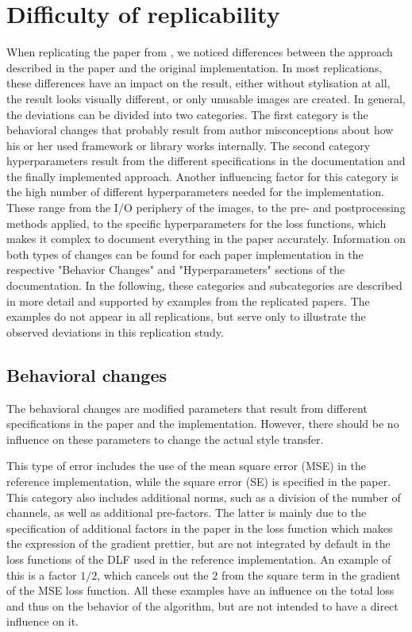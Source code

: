 \section{Difficulty of replicability} \label{sec:replicability}

When replicating the paper from , we noticed differences between the approach described in the paper and the original implementation. In most replications, these differences have an impact on the result, either without stylisation at all, the result looks visually different, or only unusable images are created. In general, the deviations can be divided into two categories. The first category is the behavioral changes that probably result from author misconceptions about how his or her used framework or library works internally. The second category hyperparameters result from the different specifications in the documentation and the finally implemented approach. Another influencing factor for this category is the high number of different hyperparameters needed for the implementation. These range from the I/O periphery of the images, to the pre- and postprocessing methods applied, to the specific hyperparameters for the loss functions, which makes it complex to document everything in the paper accurately. Information on both types of changes can be found for each paper implementation in the respective "Behavior Changes" and "Hyperparameters" sections of the documentation. In the following, these categories and subcategories are described in more detail and supported by examples from the replicated papers. The examples do not appear in all replications, but serve only to illustrate the observed deviations in this replication study.

\subsection{Behavioral changes}

The behavioral changes are modified parameters that result from different specifications in the paper and the implementation. However, there should be no influence on these parameters to change the actual style transfer.  

This type of error includes the use of the mean square error (MSE) in the reference implementation, while the square error (SE) is specified in the paper. This category also includes additional norms, such as a division of the number of channels, as well as additional pre-factors. The latter is mainly due to the specification of additional factors in the paper in the loss function which makes the expression of the gradient prettier, but are not integrated by default in the loss functions of the DLF used in the reference implementation. An example of this is a factor $1/2$, which cancels out the $2$ from the square term in the gradient of the MSE loss function. All these examples have an influence on the total loss and thus on the behavior of the algorithm, but are not intended to have a direct influence on it.

